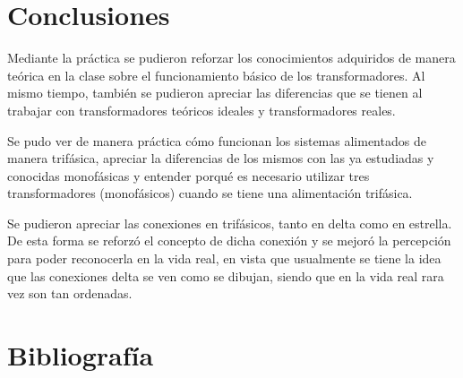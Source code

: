 \documentclass[12pt,a4paper]{article}
\begin{document}
\section{Conclusiones}
\begin{itemsinforme}
    \item Mediante la práctica se pudieron reforzar los conocimientos adquiridos de manera teórica en la clase sobre el funcionamiento básico de los transformadores. Al mismo tiempo, también se pudieron apreciar las diferencias que se tienen al trabajar con transformadores teóricos ideales y transformadores reales.
    \item Se pudo ver de manera práctica cómo funcionan los sistemas alimentados de manera trifásica, apreciar la diferencias de los mismos con las ya estudiadas y conocidas monofásicas y entender porqué es necesario utilizar tres transformadores (monofásicos) cuando se tiene una alimentación trifásica.
    \item Se pudieron apreciar las conexiones en trifásicos, tanto en delta como en estrella. De esta forma se reforzó el concepto de dicha conexión y se mejoró la percepción para poder reconocerla en la vida real, en vista que usualmente se tiene la idea que las conexiones delta se ven como se dibujan, siendo que en la vida real rara vez son tan ordenadas.
\end{itemsinforme}

\section{Bibliografía}
\nocite{*}
\printbibliography[heading=none]
\end{document}

